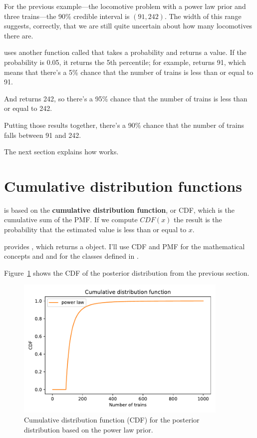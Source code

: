 \documentclass[12pt]{book}
\theoremstyle{exercise}
\begin{document}
For the previous example---the locomotive problem with a power law prior
and three trains---the 90\% credible interval is $(91, 242)$.  The
width of this range suggests, correctly, that we are still quite
uncertain about how many locomotives there are.

 uses another function called  that takes a probability and returns a value.
If the probability is 0.05, it returns the 5th percentile; for example,
 returns 91, which means that there's a 5\% chance that the number of trains is less than or equal to 91.

And  returns 242, so there's a 95\% chance that the number of trains is less than or equal to 242.

Putting those results together, there's a 90\% chance that the number of trains falls between 91 and 242.

The next section explains how  works.


\section{Cumulative distribution functions}


 is based on the {\bf cumulative distribution function}, or CDF, which is the cumulative sum of the PMF.
If we compute $CDF(x)$ the result is the probability that the estimated value is less than or equal to $x$.


 provides , which returns a  object.
I'll use CDF and PMF for the mathematical concepts and  and  for the classes defined in .

Figure~\ref{fig04-03} shows the CDF of the posterior distribution from the previous section.

\begin{figure}
\centerline{\includegraphics[width=4in]{figs/fig04-03.pdf}}
\caption{Cumulative distribution function (CDF) for the posterior distribution based on the power law prior.}
\label{fig04-03}
\end{figure}
\end{document}
